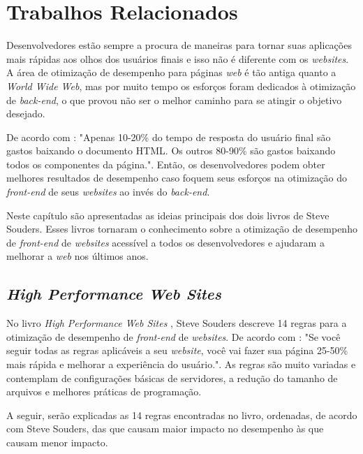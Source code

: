 %
%

\chapter{Trabalhos Relacionados}
Desenvolvedores estão sempre a procura de maneiras para tornar suas aplicações mais rápidas aos olhos dos usuários finais e isso não é diferente com os \textit{websites}. A área de otimização de desempenho para páginas \textit{web} é tão antiga quanto a \textit{World Wide Web}, mas por muito tempo os esforços foram dedicados à otimização de \textit{back-end}, o que  provou não ser o melhor caminho para se atingir o objetivo desejado.

De acordo com : "Apenas 10-20\% do tempo de resposta do usuário final são gastos baixando o documento HTML. Os outros 80-90\% são gastos baixando todos os componentes da página.". Então, os desenvolvedores podem obter melhores resultados de desempenho caso foquem seus esforços na otimização do \textit{front-end} de seus \textit{websites} ao invés do \textit{back-end}.

Neste capítulo são apresentadas as ideias principais dos dois livros  de Steve Souders. Esses livros tornaram o conhecimento sobre a otimização de desempenho de \textit{front-end} de \textit{websites} acessível a todos os desenvolvedores e ajudaram a melhorar a \textit{web} nos últimos anos.

\section{\textit{High Performance Web Sites}}
\label{sec:highperformancewebsites}

No livro \textit{High Performance Web Sites} \cite{HighPerformance}, Steve Souders descreve 14 regras para a otimização de desempenho de \textit{front-end} de \textit{websites}. De acordo com : "Se você seguir todas as regras aplicáveis a seu \textit{website}, você vai fazer sua página 25-50\% mais rápida e melhorar a experiência do usuário.". As regras são muito variadas e contemplam de configurações básicas de servidores, a redução do tamanho de arquivos e melhores práticas de programação.

A seguir, serão explicadas as 14 regras encontradas no livro, ordenadas, de acordo com Steve Souders, das que causam maior impacto no desempenho às que causam menor impacto.

